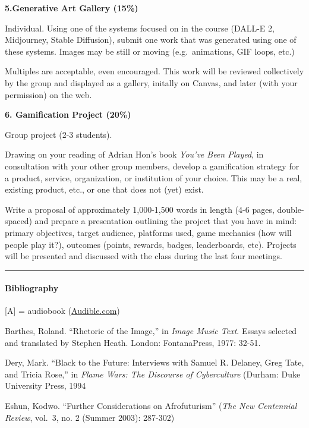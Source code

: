 \documentclass[
  letterpaper,
  DIV=11,
  numbers=noendperiod]{scrartcl}
\let\oldparagraph\paragraph
\renewcommand{\paragraph}[1]{\oldparagraph{#1}\mbox{}}
\begin{document}
\textbf{5.Generative Art Gallery (15\%)}

Individual. Using one of the systems focused on in the course (DALL-E 2,
Midjourney, Stable Diffusion), submit one work that was generated using
one of these systems. Images may be still or moving (e.g.~animations,
GIF loops, etc.)

Multiples are acceptable, even encouraged. This work will be reviewed
collectively by the group and displayed as a gallery, initally on
Canvas, and later (with your permission) on the web.

\textbf{6. Gamification Project (20\%)}

Group project (2-3 students).

Drawing on your reading of Adrian Hon's book \emph{You've Been Played},
in consultation with your other group members, develop a gamification
strategy for a product, service, organization, or institution of your
choice. This may be a real, existing product, etc., or one that does not
(yet) exist.

Write a proposal of approximately 1,000-1,500 words in length (4-6
pages, double-spaced) and prepare a presentation outlining the project
that you have in mind: primary objectives, target audience, platforms
used, game mechanics (how will people play it?), outcomes (points,
rewards, badges, leaderboards, etc). Projects will be presented and
discussed with the class during the last four meetings.

\begin{center}\rule{0.5\linewidth}{0.5pt}\end{center}

\hypertarget{bibliography}{%
\paragraph{Bibliography}\label{bibliography}}

{[}A{]} = audiobook (\href{http://audible.com/}{Audible.com})

Barthes, Roland. ``Rhetoric of the Image,'' in \emph{Image Music Text}.
Essays selected and translated by Stephen Heath. London: FontanaPress,
1977: 32-51.

Dery, Mark. ``Black to the Future: Interviews with Samuel R. Delaney,
Greg Tate, and Tricia Rose,'' in \emph{Flame Wars: The Discourse of
Cyberculture} (Durham: Duke University Press, 1994

Eshun, Kodwo. ``Further Considerations on Afrofuturism'' (\emph{The New
Centennial Review}, vol.~3, no. 2 (Summer 2003): 287-302)
\end{document}
